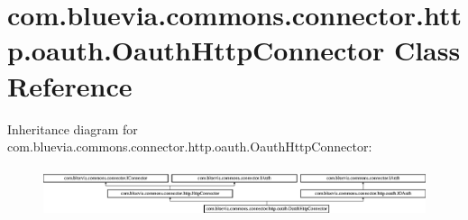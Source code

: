 \hypertarget{classcom_1_1bluevia_1_1commons_1_1connector_1_1http_1_1oauth_1_1OauthHttpConnector}{
\section{com.bluevia.commons.connector.http.oauth.OauthHttpConnector Class Reference}
\label{classcom_1_1bluevia_1_1commons_1_1connector_1_1http_1_1oauth_1_1OauthHttpConnector}
}
Inheritance diagram for com.bluevia.commons.connector.http.oauth.OauthHttpConnector:\begin{figure}[H]
\begin{center}
\leavevmode
\includegraphics[height=1.462141cm]{classcom_1_1bluevia_1_1commons_1_1connector_1_1http_1_1oauth_1_1OauthHttpConnector}
\end{center}
\end{figure}
